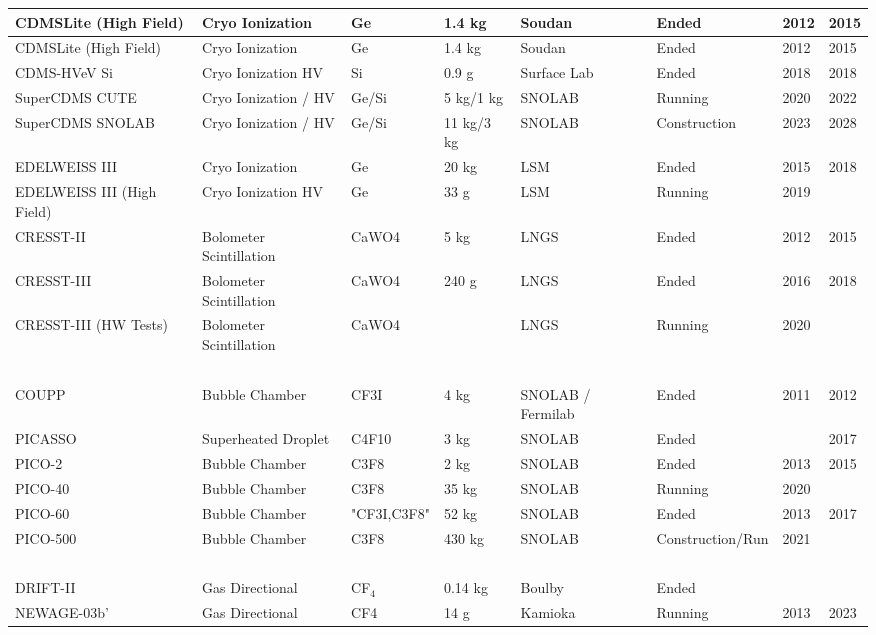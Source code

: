 \begin{table}[!ht]
\begin{tabular}{|l|l|l|l|l|l|l|l|}
        CDMSLite (High Field) & Cryo Ionization & Ge & 1.4 kg & Soudan & Ended & 2012 & 2015 \\ \hline
        CDMSLite (High Field) & Cryo Ionization & Ge & 1.4 kg & Soudan & Ended & 2012 & 2015 \\ \hline
        CDMS-HVeV Si & Cryo Ionization HV & Si & 0.9 g & Surface Lab & Ended & 2018 & 2018 \\ \hline
        SuperCDMS CUTE & Cryo Ionization / HV & Ge/Si & 5 kg/1 kg & SNOLAB & Running & 2020 & 2022 \\ \hline
        SuperCDMS SNOLAB & Cryo Ionization / HV & Ge/Si & 11 kg/3 kg & SNOLAB & Construction & 2023 & 2028 \\ \hline
        EDELWEISS III & Cryo Ionization & Ge & 20 kg & LSM & Ended & 2015 & 2018 \\ \hline
        EDELWEISS III (High Field) & Cryo Ionization HV & Ge & 33 g & LSM & Running & 2019 & ~ \\ \hline
        CRESST-II & Bolometer Scintillation & CaWO4 & 5 kg & LNGS & Ended & 2012 & 2015 \\ \hline
        CRESST-III & Bolometer Scintillation & CaWO4 & 240 g & LNGS & Ended & 2016 & 2018 \\ \hline
        CRESST-III (HW Tests) & Bolometer Scintillation & CaWO4 & ~ & LNGS & Running & 2020 & ~ \\ \hline
        ~ & ~ & ~ & ~ & ~ & ~ & ~ & ~ \\ \hline
        COUPP & Bubble Chamber & CF3I & 4 kg & SNOLAB / Fermilab & Ended & 2011 & 2012 \\ \hline
        PICASSO & Superheated Droplet & C4F10 & 3 kg & SNOLAB & Ended & ~ & 2017 \\ \hline
        PICO-2 & Bubble Chamber & C3F8 & 2 kg & SNOLAB & Ended & 2013 & 2015 \\ \hline
        PICO-40 & Bubble Chamber & C3F8 & 35 kg & SNOLAB & Running & 2020 & ~ \\ \hline
        PICO-60 & Bubble Chamber & "CF3I,C3F8" & 52 kg & SNOLAB & Ended & 2013 & 2017 \\ \hline
        PICO-500 & Bubble Chamber & C3F8 & 430 kg & SNOLAB & Construction/Run & 2021 & ~ \\ \hline
        ~ & ~ & ~ & ~ & ~ & ~ & ~ & ~ \\ \hline
        DRIFT-II & Gas Directional & CF$_4$ & 0.14 kg & Boulby & Ended & ~ & ~ \\ \hline
        NEWAGE-03b' & Gas Directional & CF4 & 14 g & Kamioka ~ & Running & 2013 &2023 \\ \hline

\end{tabular}
\end{table}
